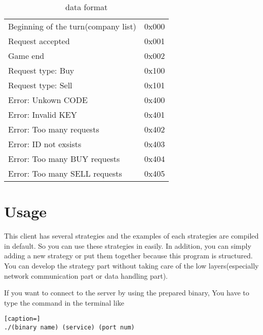 \documentclass{article}
\begin{document}

    \newpage

    \begin{table}[h]
        \begin{center}
            \begin{tabular}{ll}
            Beginning of the turn(company list) & 0x000 \\
            Request accepted & 0x001 \\
            Game end & 0x002 \\
            Request type: Buy & 0x100 \\
            Request type: Sell & 0x101 \\
            Error: Unkown CODE & 0x400 \\
            Error: Invalid KEY & 0x401 \\
            Error: Too many requests & 0x402 \\
            Error: ID not exsists & 0x403 \\
            Error: Too many BUY requests & 0x404 \\
            Error: Too many SELL requests & 0x405
            \end{tabular}
            \caption{data format}
            \label{tab:message_list}
        \end{center}
    \end{table}

    \section{Usage} %
    \label{sec:usage}

        This client has several strategies and the examples of each strategies are compiled in default.
        So you can use these strategies in easily.
        In addition, you can simply adding a new strategy or put them together because this program is structured.
        You can develop the strategy part without taking care of the low layers(especially network communication part or data handling part).

        If you want to connect to the server by using the prepared binary,
        You have to type the command in the terminal like

        \begin{lstlisting}[caption=]
./(binary name) (service) (port num)
        \end{lstlisting}
\end{document}
